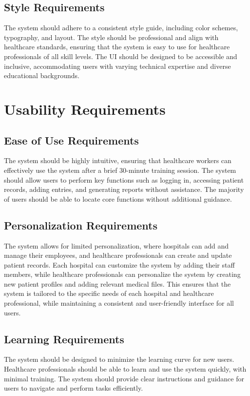 \documentclass[12pt]{article}
\begin{document}
\subsection{Style Requirements}
The system should adhere to a consistent style guide, including color schemes, typography, and layout. The style should be professional and align with healthcare standards, ensuring that the system is easy to use for healthcare professionals of all skill levels. The UI should be designed to be accessible and inclusive, accommodating users with varying technical expertise and diverse educational backgrounds.

\section{Usability Requirements}
\subsection{Ease of Use Requirements}
The system should be highly intuitive, ensuring that healthcare workers can effectively use the system after a brief 30-minute training session. The system should allow users to perform key functions such as logging in, accessing patient records, adding entries, and generating reports without assistance. The majority of users should be able to locate core functions without additional guidance.

\subsection{Personalization Requirements}
The system allows for limited personalization, where hospitals can add and manage their employees, and healthcare professionals can create and update patient records. Each hospital can customize the system by adding their staff members, while healthcare professionals can personalize the system by creating new patient profiles and adding relevant medical files. This ensures that the system is tailored to the specific needs of each hospital and healthcare professional, while maintaining a consistent and user-friendly interface for all users.

\subsection{Learning Requirements}
The system should be designed to minimize the learning curve for new users. Healthcare professionals should be able to learn and use the system quickly, with minimal training. The system should provide clear instructions and guidance for users to navigate and perform tasks efficiently.
\end{document}
